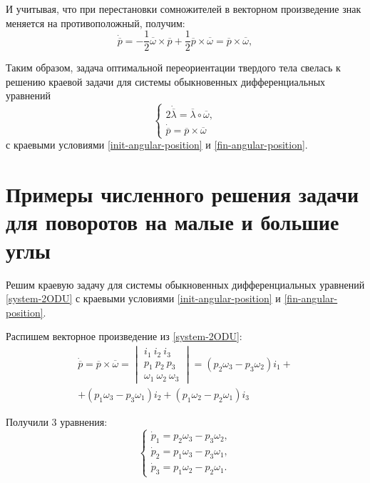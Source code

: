 \documentclass[14pt]{extreport}
\begin{document}
И учитывая, что при перестановки сомножителей в векторном произведение знак меняется на противоположный, получим:
\begin{equation}
\dot{\overline{p}}=-\dfrac{1}{2} \overline{\omega} \times \overline{p}+
\dfrac{1}{2} \overline{p} \times \overline{\omega} = \overline{p} \times \overline{\omega},
\end{equation}

Таким образом, задача оптимальной переориентации твердого тела све­лась к решению краевой задачи для системы обыкновенных дифференци­альных уравнений
\begin{equation}
\label{system-2ODU}
\begin{cases}
	2\dot{\overline{\lambda}} = \overline{\lambda} \circ \overline{\omega},\\
	\dot{\overline{p}} = \overline{p} \times \overline{\omega}
\end{cases}
\end{equation}
с краевыми условиями \eqref{init-angular-position} и \eqref{fin-angular-position}.

\chapter{Примеры численного решения задачи для поворотов на малые и большие углы}
Решим краевую задачу для системы обыкновенных дифференци­альных уравнений \eqref{system-2ODU} с краевыми условиями \eqref{init-angular-position} и \eqref{fin-angular-position}.

Распишем векторное произведение из \eqref{system-2ODU}:
\begin{equation}
\begin{split}
\dot{\overline{p}}=\overline{p} \times \overline{\omega} =
\begin{vmatrix}
  i_{1}\ i_{2}\ i_{3}\\
  p_{1}\ p_{2}\ p_{3}\\
  \omega_{1}\ \omega_{2}\ \omega_{3}
\end{vmatrix}=
(p_2 \omega_3 - p_3 \omega_2)i_1 +\\
+ (p_1 \omega_3 - p_3 \omega_1)i_2 + (p_1 \omega_2 - p_2 \omega_1)i_3
\end{split}
\end{equation}

Получили 3 уравнения:
\begin{equation}
\begin{cases}
\dot{p}_1 = p_2 \omega_3 - p_3 \omega_2,\\
\dot{p}_2 = p_1 \omega_3 - p_3 \omega_1,\\
\dot{p}_3 = p_1 \omega_2 - p_2 \omega_1.
\end{cases}
\end{equation}
\end{document}
